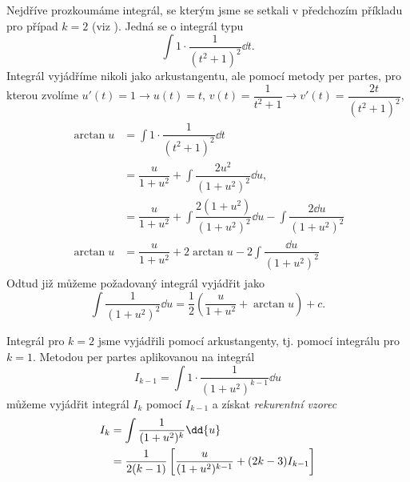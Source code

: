       Nejdříve prozkoumáme integrál, se kterým jsme se setkali v předchozím příkladu pro případ
      \(k = 2\) (viz \cite[p.~141]{Musilova2009MA1}). Jedná se o integrál typu 
      \begin{equation*}
        \int{1\cdot\dfrac{1}{(t^2 + 1)^{2}}\dd{t}}.
      \end{equation*}
      Integrál vyjádříme nikoli jako arkustangentu, ale pomocí metody per partes, pro kterou zvolíme
      \(u'(t)=1\rightarrow u(t)=t\), \(v(t) = \dfrac{1}{t^2+1}\rightarrow v'(t) =
      \dfrac{2t}{(t^2+1)^2}\),
      \begin{gather*} 
        \begin{align*}
          \arctan u &=  \int{1\cdot\dfrac{1}{(t^2 + 1)^{2}}\dd{t}}              \\
                    &=  \dfrac{u}{1+u^2} + \int\dfrac{2u^2}{(1+u^2)^2}\dd{u},   \\
                    &=  \dfrac{u}{1+u^2} + \int\dfrac{2(1+u^2)}{(1+u^2)^2}\dd{u}
                                        - \int\dfrac{2\dd{u}}{(1+u^2)^2}      \\
          \arctan u &=  \dfrac{u}{1+u^2} + 2\arctan u - 2\int\dfrac{\dd{u}}{(1+u^2)^2}  
        \end{align*}
      \end{gather*}  
      Odtud již můžeme požadovaný integrál vyjádřit jako
      \begin{equation*}
        \int\dfrac{1}{(1+u^2)^2}\dd{u} = \dfrac{1}{2}\left(\dfrac{u}{1+u^2} + \arctan u\right) + c. 
      \end{equation*}

      Integrál pro \(k=2\) jsme vyjádřili pomocí arkustangenty, tj. pomocí integrálu pro \(k=1\).
      Metodou per partes aplikovanou na integrál
      \begin{equation*}
        I_{k-1} = \int1\cdot\dfrac{1}{(1+u^2)^{k-1}}\dd{u}
      \end{equation*}
      můžeme vyjádřit integrál \(I_k\) pomocí \(I_{k-1}\) a získat \emph{rekurentní vzorec}
      \begin{align}
        I_k &= \int\dfrac{1}{(1+u^2)^k}\dd{u}                                   \label{mai:eq165} \\
            &= \dfrac{1}{2(k-1)}\left[\dfrac{u}{(1+u^2)^{k-1}}+(2k-3)I_{k-1}\right]  \notag
      \end{align}

